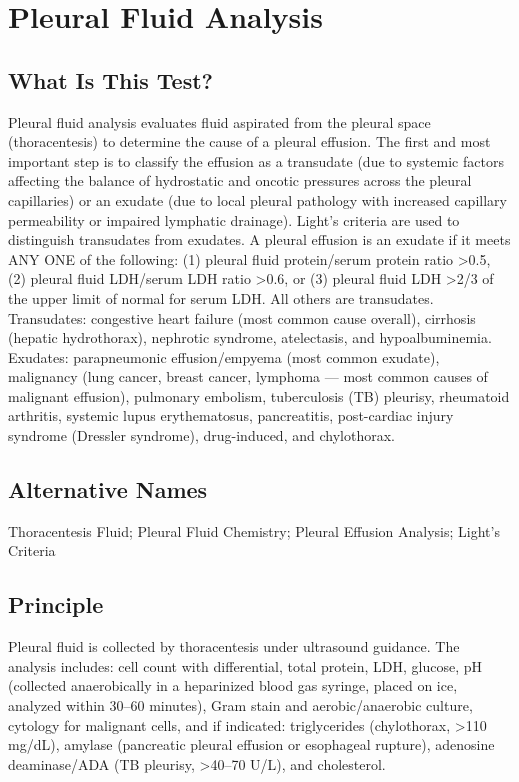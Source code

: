 \chapter{Pleural Fluid Analysis}
\section*{What Is This Test?}
Pleural fluid analysis evaluates fluid aspirated from the pleural space (thoracentesis) to determine the cause of a pleural effusion. The first and most important step is to classify the effusion as a transudate (due to systemic factors affecting the balance of hydrostatic and oncotic pressures across the pleural capillaries) or an exudate (due to local pleural pathology with increased capillary permeability or impaired lymphatic drainage). Light's criteria are used to distinguish transudates from exudates. A pleural effusion is an exudate if it meets ANY ONE of the following: (1) pleural fluid protein/serum protein ratio >0.5, (2) pleural fluid LDH/serum LDH ratio >0.6, or (3) pleural fluid LDH >2/3 of the upper limit of normal for serum LDH. All others are transudates. Transudates: congestive heart failure (most common cause overall), cirrhosis (hepatic hydrothorax), nephrotic syndrome, atelectasis, and hypoalbuminemia. Exudates: parapneumonic effusion/empyema (most common exudate), malignancy (lung cancer, breast cancer, lymphoma --- most common causes of malignant effusion), pulmonary embolism, tuberculosis (TB) pleurisy, rheumatoid arthritis, systemic lupus erythematosus, pancreatitis, post-cardiac injury syndrome (Dressler syndrome), drug-induced, and chylothorax.
\section*{Alternative Names}
Thoracentesis Fluid; Pleural Fluid Chemistry; Pleural Effusion Analysis; Light's Criteria
\section*{Principle}
Pleural fluid is collected by thoracentesis under ultrasound guidance. The analysis includes: cell count with differential, total protein, LDH, glucose, pH (collected anaerobically in a heparinized blood gas syringe, placed on ice, analyzed within 30--60 minutes), Gram stain and aerobic/anaerobic culture, cytology for malignant cells, and if indicated: triglycerides (chylothorax, >110 mg/dL), amylase (pancreatic pleural effusion or esophageal rupture), adenosine deaminase/ADA (TB pleurisy, >40--70 U/L), and cholesterol.
